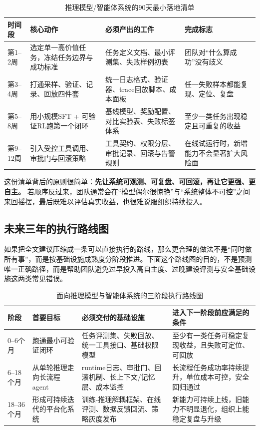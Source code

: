 \documentclass[12pt,a4paper]{article}
\begin{document}
\begin{table}[H]
\centering
\small
\caption{推理模型/智能体系统的90天最小落地清单}
\begin{tabular}{p{2.2cm}p{4.4cm}p{4.2cm}p{2.9cm}}
\toprule
\textbf{时间段} & \textbf{核心动作} & \textbf{必须产出的工件} & \textbf{完成标志} \\
\midrule
第1--2周 & 选定单一高价值任务，冻结任务边界与成功标准 & 任务定义文档、最小评测集、失败样例初表 & 团队对“什么算成功”没有歧义 \\
第3--4周 & 打通采样、验证、记录、回放四件套 & 统一日志格式、验证器、trace回放脚本、成本面板 & 任一失败样本都能复现、定位、复盘 \\
第5--8周 & 用小规模SFT + 可验证RL跑第一个闭环 & 基线模型、奖励配置、对比实验表、失败标签体系 & 至少一类任务出现稳定且可重复的收益 \\
第9--12周 & 引入受控工具调用、审批门与回滚策略 & 工具契约、权限分层、审批记录、回滚与告警规则 & 在线试运行时，新增能力不会显著扩大风险面 \\
\bottomrule
\end{tabular}
\end{table}

这份清单背后的原则很简单：\textbf{先让系统可观测、可复盘、可回滚，再让它更强、更自主。} 若顺序反过来，团队通常会在“模型偶尔很惊艳”与“系统整体不可控”之间来回摇摆，最后既难以评估真实收益，也很难说服组织持续投入。

\subsection{未来三年的执行路线图}

如果把全文建议压缩成一条可以直接执行的路线，那么更合理的做法不是“同时做所有事”，而是按基础设施成熟度分阶段推进。下面这个路线图的目的，不是预测唯一正确路径，而是帮助团队避免过早投入高自主度、过晚建设评测与安全基础设施这两类常见错误。

\begin{table}[H]
\centering
\small
\caption{面向推理模型与智能体系统的三阶段执行路线图}
\begin{tabular}{p{2.2cm}p{3.8cm}p{4.0cm}p{3.6cm}}
\toprule
\textbf{阶段} & \textbf{首要目标} & \textbf{必须交付的基础设施} & \textbf{进入下一阶段前应满足的条件} \\
\midrule
0--6个月 & 跑通最小可验证闭环 & 任务评测集、失败回放、统一工具接口、基础权限模型 & 至少有一类任务可稳定复现收益，且失败可定位、可回放 \\
6--18个月 & 从单轮推理走向长流程agent & runtime日志、审批门、回滚机制、长上下文/记忆层、成本监控 & 长流程任务成功率持续提升，单位成本可控，安全回归通过 \\
18--36个月 & 形成可持续迭代的平台化系统 & 训练-推理解耦框架、在线评测、数据反馈回流、策略灰度发布 & 新能力可持续上线，旧能力不明显退化，组织上能稳定复盘与升级 \\
\bottomrule
\end{tabular}
\end{table}
\end{document}
